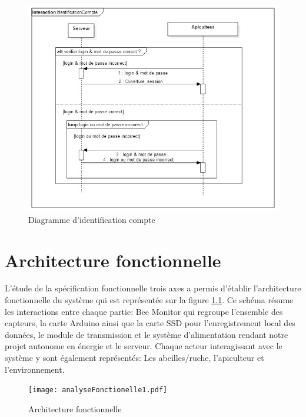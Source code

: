 \begin{figure}[h!]
\centering\includegraphics[scale=0.7]{IdentificationCompte.jpg}
\caption{\label{fig:seq5} Diagramme d'identification compte}
\end{figure}
\pagebreak

\chapter{Architecture fonctionnelle}

L'étude de la spécification fonctionnelle trois axes a permis d'établir l'architecture fonctionnelle du système qui est représentée sur la figure \ref{fig:anaFonc}.
Ce schéma résume les interactions entre chaque partie: Bee Monitor qui regroupe l'ensemble des capteurs, la carte Arduino ainsi que la carte SSD pour l'enregistrement local des données, le module de transmission et le système d'alimentation rendant notre projet autonome en énergie et le serveur. Chaque acteur interagissant avec le système y sont également représentés: Les abeilles/ruche, l'apiculteur et l'environnement.   
  

\begin{figure}[h]
\centering\texttt{[image: analyseFonctionelle1.pdf]}
\caption{\label{fig:anaFonc} Architecture fonctionnelle}
\end{figure}    

